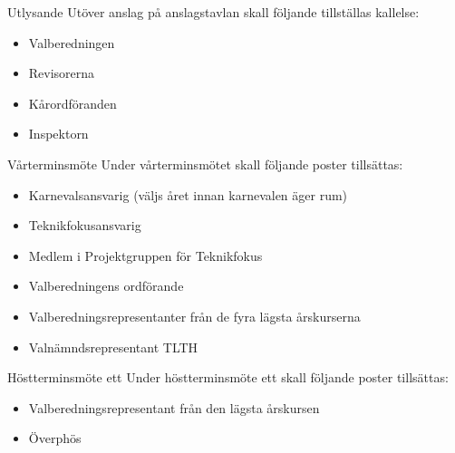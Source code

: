 \documentclass[pdfbookmarks,a4paper,11pt]{article}
\newlength{\itemcollength}
\newenvironment{reglemlista}{%
  \begin{list}{}{%
      \setlength{\labelwidth}{\itemcollength}%
      \setlength{\leftmargin}{\labelwidth + \labelsep}%
      \renewcommand{\makelabel}[1]{%
        \raisebox{0pt}[1ex][0pt]{%
          \makebox[\labelwidth][l]{%
            \parbox[t]{\itemcollength}{%
              \raggedright\hspace{0pt}##1}}}\hfill}%
      }}{%
  \end{list}}
\begin{document}
\begin{reglemlista}

	\item[Utlysande]
	Utöver anslag på anslagstavlan skall följande tillställas kallelse:
	\begin{itemize}
		\item Valberedningen
		\item Revisorerna
		\item Kårordföranden
		\item Inspektorn
	\end{itemize}

	\item[Vårterminsmöte]
	Under vårterminsmötet skall följande poster tillsättas:
	\begin{itemize}

		\item Karnevalsansvarig (väljs året innan karnevalen äger rum)
		\item Teknikfokusansvarig
		\item Medlem i Projektgruppen för Teknikfokus
		\item Valberedningens ordförande
		\item Valberedningsrepresentanter från de fyra lägsta årskurserna
		\item Valnämndsrepresentant TLTH
	\end{itemize}

	\item[Höstterminsmöte ett]
	Under höstterminsmöte ett skall följande poster tillsättas:
	\begin{itemize}
		\item Valberedningsrepresentant från den lägsta årskursen
		\item Överphös
	\end{itemize}


\end{reglemlista}
\end{document}
